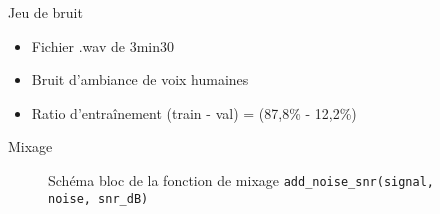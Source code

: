 \documentclass{beamer}
\begin{document}
\begin{frame}{Jeu de bruit}
\begin{itemize}[label=$\bullet$]
    \item Fichier .wav de 3min30
    \item Bruit d'ambiance de voix humaines
    \item Ratio d'entraînement (train - val) = (87,8\% - 12,2\%)
\end{itemize}

\begin{table}[]
\center
{}
\captionsetup{justification=centering,margin=0cm}
\caption{Découpage du fichier de bruit.}
\label{tab:dataset_repartition}
\end{table}
\end{frame}




\begin{frame}{Mixage}
\begin{figure}
    \centering
    \resizebox{\linewidth}{!}{%
        
    }
    \captionsetup{justification=centering,margin=1cm}
    \caption{Schéma bloc de la fonction de mixage \texttt{add\_noise\_snr(signal, noise, snr\_dB)}}
    \label{fig:block_mixage}
\end{figure}
\end{frame}
\end{document}
